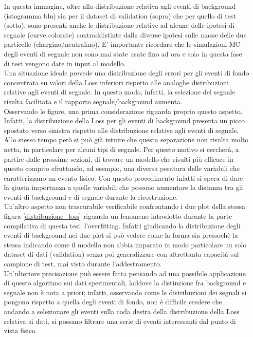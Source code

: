 In questa immagine, oltre alla distribuzione relativa agli eventi di background (istogramma blu) sia per il dataset di validation (sopra) che per quello di test (sotto), sono presenti anche le distribuzione relative ad alcune delle ipotesi di segnale (curve colorate) contraddistinte dalla diverse ipotesi sulle masse delle due particelle (chargino/neutralino). E' importante ricordare che le simulazioni MC degli eventi di segnale non sono mai state usate fino ad ora e solo in questa fase di test vengono date in input al modello. \\
Una situazione ideale prevede una distribuzione degli errori per gli eventi di fondo concentrata su valori della Loss inferiori rispetto alle analoghe distribuzioni relative agli eventi di segnale. In questo modo, infatti, la selezione del segnale risulta facilitata e il rapporto segnale/background aumenta.\\
Osservando le figure, una prima considerazione riguarda proprio questo aspetto. Infatti, la distribuzione della Loss per gli eventi di background presenta un picco spostato verso sinistra rispetto alle distribuzione relative agli eventi di segnale. \\ 
Allo stesso tempo però si può già intuire che questa separazione non risulta molto netta, in particolare per alcuni tipi di segnale. Per questo motivo si cercherà, a partire dalle prossime sezioni, di trovare un modello che risulti più efficace in questo compito sfruttando, ad esempio, una diversa pesatura delle variabili che caratterizzano un evento fisico. Con questo procedimento infatti si spera di dare la giusta importanza a quelle variabili che possono aumentare la distanza tra gli eventi di background e di segnale durante la ricostruzione.\\
Un'altro aspetto non trascurabile verificabile confrontando i due plot della stessa figura \ref{distribuzione_loss} riguarda un fenomeno introdotto durante la parte compilativa di questa tesi: l'overfitting. Infatti giudicando la distribuzione degli eventi di background nei due plot si può vedere come la forma sia pressochè la stessa indicando come il modello non abbia imparato in modo particolare un solo dataset di dati (validation) senza poi generalizzare con altrettanta capacità sul campione di test, mai visto durante l'addestramento.\\
Un'ulteriore precisazione può essere fatta pensando ad una possibile applicazione di questo algoritmo sui dati sperimentali, laddove la distinzione fra background e segnale non è nota a priori; infatti, osservando come le distribuzioni dei segnali si pongono rispetto a quella degli eventi di fondo, non è difficile credere che andando a selezionare gli eventi sulla coda destra della distribuzione della Loss relativa ai dati, si possano filtrare una serie di eventi interessanti dal punto di vista fisico.

